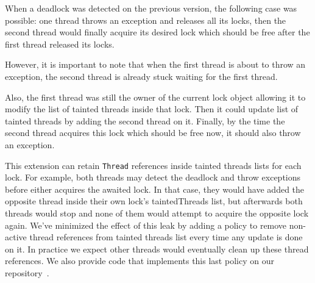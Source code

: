 When a deadlock was detected on the previous version, the following case was possible:
one thread throws an exception and releases all its locks,
then the second thread would finally acquire its desired lock
which should be free after the first thread released its locks.

However, it is important to note that when the first thread is about to throw an exception,
the second thread is already stuck waiting for the first thread.

Also, the first thread was still the owner of the current lock object allowing it to modify the list of tainted threads inside that lock.
Then it could update list of tainted threads by adding the second thread on it.
Finally, by the time the second thread acquires this lock which should be free now, it should also throw an exception.

This extension can retain {\tt Thread} references inside tainted threads lists for each lock.
For example, both threads may detect the deadlock and throw exceptions before either acquires the awaited lock.
In that case, they would have added the opposite thread inside their own lock's taintedThreads list, but afterwards
both threads would stop and none of them would attempt to acquire the opposite lock again.
We've minimized the effect of this leak by adding a policy to remove non-active thread
references from tainted threads list every time any update is done on it.
In practice we expect other threads would eventually clean up these thread references.
We also provide code that implements this last policy on our repository~\cite{repo}.
